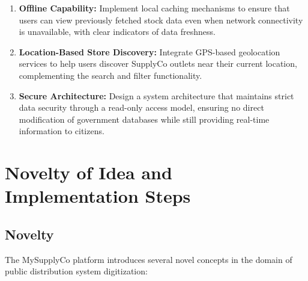 \begin{enumerate}[label=\arabic*.]
    \item \textbf{Offline Capability:} Implement local caching mechanisms to ensure that users can view previously fetched stock data even when network connectivity is unavailable, with clear indicators of data freshness.

    \item \textbf{Location-Based Store Discovery:} Integrate GPS-based geolocation services to help users discover SupplyCo outlets near their current location, complementing the search and filter functionality.

    \item \textbf{Secure Architecture:} Design a system architecture that maintains strict data security through a read-only access model, ensuring no direct modification of government databases while still providing real-time information to citizens.
\end{enumerate}

\section{Novelty of Idea and Implementation Steps}

\subsection{Novelty}

The MySupplyCo platform introduces several novel concepts in the domain of public distribution system digitization:


